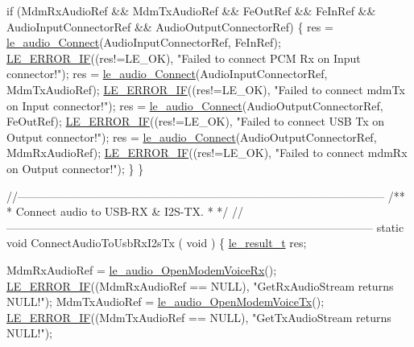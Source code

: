 \begin{DoxyCodeInclude}
{{{{    \textcolor{keywordflow}{if} (MdmRxAudioRef && MdmTxAudioRef && FeOutRef && FeInRef &&
        AudioInputConnectorRef && AudioOutputConnectorRef)
    \{
        res = \hyperlink{le__audio__interface_8h_a338df65b2fb1ae0140d86880adbcf0de}{le\_audio\_Connect}(AudioInputConnectorRef, FeInRef);
        \hyperlink{le__log_8h_aceaf11a11691d6c676e36dd317b38dbd}{LE\_ERROR\_IF}((res!=LE\_OK), \textcolor{stringliteral}{"Failed to connect PCM Rx on Input connector!"});
        res = \hyperlink{le__audio__interface_8h_a338df65b2fb1ae0140d86880adbcf0de}{le\_audio\_Connect}(AudioInputConnectorRef, MdmTxAudioRef);
        \hyperlink{le__log_8h_aceaf11a11691d6c676e36dd317b38dbd}{LE\_ERROR\_IF}((res!=LE\_OK), \textcolor{stringliteral}{"Failed to connect mdmTx on Input connector!"});
        res = \hyperlink{le__audio__interface_8h_a338df65b2fb1ae0140d86880adbcf0de}{le\_audio\_Connect}(AudioOutputConnectorRef, FeOutRef);
        \hyperlink{le__log_8h_aceaf11a11691d6c676e36dd317b38dbd}{LE\_ERROR\_IF}((res!=LE\_OK), \textcolor{stringliteral}{"Failed to connect USB Tx on Output connector!"});
        res = \hyperlink{le__audio__interface_8h_a338df65b2fb1ae0140d86880adbcf0de}{le\_audio\_Connect}(AudioOutputConnectorRef, MdmRxAudioRef);
        \hyperlink{le__log_8h_aceaf11a11691d6c676e36dd317b38dbd}{LE\_ERROR\_IF}((res!=LE\_OK), \textcolor{stringliteral}{"Failed to connect mdmRx on Output connector!"});
    \}
\}

\textcolor{comment}{//--------------------------------------------------------------------------------------------------}\textcolor{comment}{}
\textcolor{comment}{/**}
\textcolor{comment}{ * Connect audio to USB-RX & I2S-TX.}
\textcolor{comment}{ *}
\textcolor{comment}{ */}
\textcolor{comment}{//--------------------------------------------------------------------------------------------------}
\textcolor{keyword}{static} \textcolor{keywordtype}{void} ConnectAudioToUsbRxI2sTx
(
    \textcolor{keywordtype}{void}
)
\{
    \hyperlink{le__basics_8h_a1cca095ed6ebab24b57a636382a6c86c}{le\_result\_t} res;

    MdmRxAudioRef = \hyperlink{le__audio__interface_8h_ae3ed568ba4d2763ea77e17e77b20ff02}{le\_audio\_OpenModemVoiceRx}();
    \hyperlink{le__log_8h_aceaf11a11691d6c676e36dd317b38dbd}{LE\_ERROR\_IF}((MdmRxAudioRef == NULL), \textcolor{stringliteral}{"GetRxAudioStream returns NULL!"});
    MdmTxAudioRef = \hyperlink{le__audio__interface_8h_ad745f008bb04873c817da7af3daf783d}{le\_audio\_OpenModemVoiceTx}();
    \hyperlink{le__log_8h_aceaf11a11691d6c676e36dd317b38dbd}{LE\_ERROR\_IF}((MdmTxAudioRef == NULL), \textcolor{stringliteral}{"GetTxAudioStream returns NULL!"});

}}}}
\end{DoxyCodeInclude}
